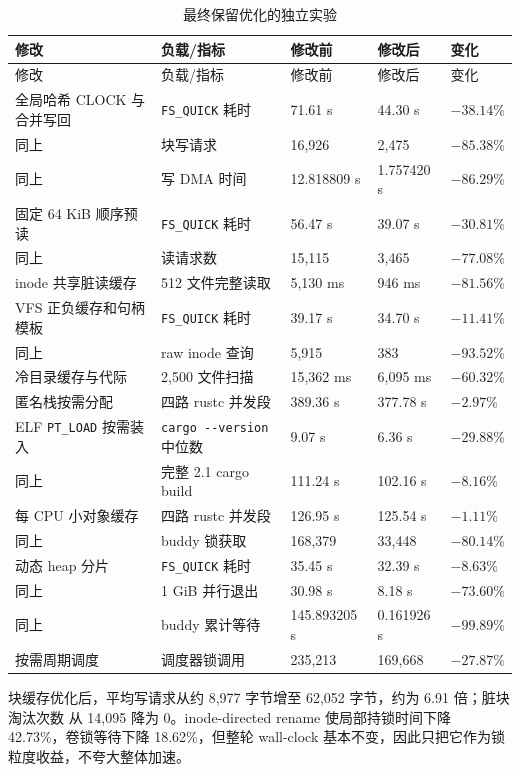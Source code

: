\documentclass[UTF8,zihao=-4]{ctexart}
\newcommand{\code}{\nolinkurl}
\begin{document}
\begin{longtable}{p{}p{}p{}p{}p{}}
\caption{最终保留优化的独立实验}\label{tab:ab-kept}\\
\toprule
修改 & 负载/指标 & 修改前 & 修改后 & 变化 \\
\midrule
\endfirsthead
\toprule
修改 & 负载/指标 & 修改前 & 修改后 & 变化 \\
\midrule
\endhead
全局哈希 CLOCK 与合并写回 & \code{FS_QUICK} 耗时 & 71.61 s & 44.30 s & $-38.14\%$ \\
同上 & 块写请求 & 16,926 & 2,475 & $-85.38\%$ \\
同上 & 写 DMA 时间 & 12.818809 s & 1.757420 s & $-86.29\%$ \\
固定 64 KiB 顺序预读 & \code{FS_QUICK} 耗时 & 56.47 s & 39.07 s & $-30.81\%$ \\
同上 & 读请求数 & 15,115 & 3,465 & $-77.08\%$ \\
inode 共享脏读缓存 & 512 文件完整读取 & 5,130 ms & 946 ms & $-81.56\%$ \\
VFS 正负缓存和句柄模板 & \code{FS_QUICK} 耗时 & 39.17 s & 34.70 s & $-11.41\%$ \\
同上 & raw inode 查询 & 5,915 & 383 & $-93.52\%$ \\
冷目录缓存与代际 & 2,500 文件扫描 & 15,362 ms & 6,095 ms & $-60.32\%$ \\
匿名栈按需分配 & 四路 rustc 并发段 & 389.36 s & 377.78 s & $-2.97\%$ \\
ELF \code{PT_LOAD} 按需装入 & \code{cargo --version} 中位数 & 9.07 s & 6.36 s & $-29.88\%$ \\
同上 & 完整 2.1 cargo build & 111.24 s & 102.16 s & $-8.16\%$ \\
每 CPU 小对象缓存 & 四路 rustc 并发段 & 126.95 s & 125.54 s & $-1.11\%$ \\
同上 & buddy 锁获取 & 168,379 & 33,448 & $-80.14\%$ \\
动态 heap 分片 & \code{FS_QUICK} 耗时 & 35.45 s & 32.39 s & $-8.63\%$ \\
同上 & 1 GiB 并行退出 & 30.98 s & 8.18 s & $-73.60\%$ \\
同上 & buddy 累计等待 & 145.893205 s & 0.161926 s & $-99.89\%$ \\
按需周期调度 & 调度器锁调用 & 235,213 & 169,668 & $-27.87\%$ \\
\bottomrule
\end{longtable}

块缓存优化后，平均写请求从约 8,977 字节增至 62,052 字节，约为 6.91 倍；脏块淘汰次数
从 14,095 降为 0。inode-directed rename 使局部持锁时间下降 42.73\%，卷锁等待下降
18.62\%，但整轮 wall-clock 基本不变，因此只把它作为锁粒度收益，不夸大整体加速。
\end{document}
